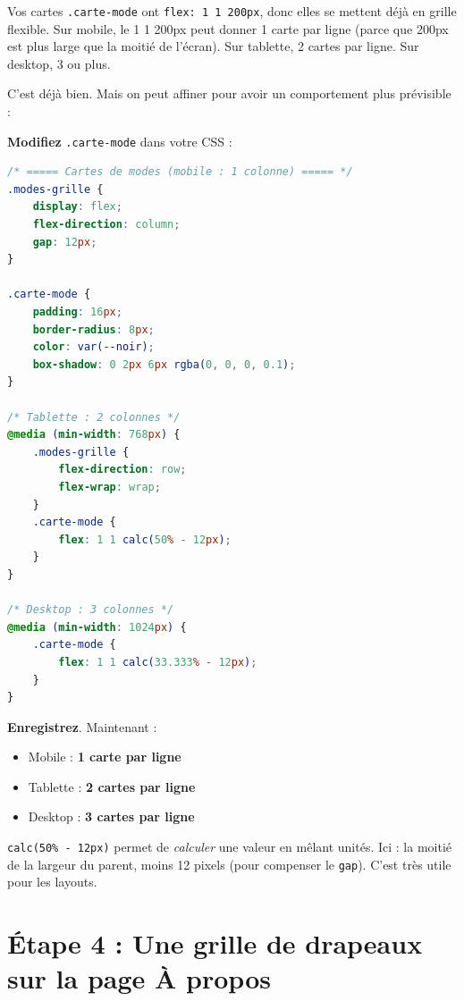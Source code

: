 \documentclass[11pt,a4paper]{article}
\newcommand{\cmark}{\ding{51}}
\begin{document}
Vos cartes \texttt{.carte-mode} ont \texttt{flex: 1 1 200px}, donc elles
se mettent déjà en grille flexible. Sur mobile, le \og{}1 1 200px\fg{}
peut donner 1 carte par ligne (parce que 200px est plus large que la
moitié de l'écran). Sur tablette, 2 cartes par ligne. Sur desktop, 3 ou
plus.

C'est déjà bien. Mais on peut affiner pour avoir un comportement plus
prévisible :

\textbf{Modifiez} \texttt{.carte-mode} dans votre CSS :

\begin{lstlisting}[language=CSS]
/* ===== Cartes de modes (mobile : 1 colonne) ===== */
.modes-grille {
    display: flex;
    flex-direction: column;
    gap: 12px;
}

.carte-mode {
    padding: 16px;
    border-radius: 8px;
    color: var(--noir);
    box-shadow: 0 2px 6px rgba(0, 0, 0, 0.1);
}

/* Tablette : 2 colonnes */
@media (min-width: 768px) {
    .modes-grille {
        flex-direction: row;
        flex-wrap: wrap;
    }
    .carte-mode {
        flex: 1 1 calc(50% - 12px);
    }
}

/* Desktop : 3 colonnes */
@media (min-width: 1024px) {
    .carte-mode {
        flex: 1 1 calc(33.333% - 12px);
    }
}
\end{lstlisting}

\textbf{Enregistrez}. Maintenant :
\begin{itemize}[nosep]
    \item Mobile : \textbf{1 carte par ligne}
    \item Tablette : \textbf{2 cartes par ligne}
    \item Desktop : \textbf{3 cartes par ligne}
\end{itemize}

\cmark

\begin{infobox}
\texttt{calc(50\% - 12px)} permet de \emph{calculer} une valeur en mêlant
unités. Ici : la moitié de la largeur du parent, moins 12 pixels (pour
compenser le \texttt{gap}). C'est très utile pour les layouts.
\end{infobox}

\newpage

\section{Étape 4 : Une grille de drapeaux sur la page À propos}
\end{document}
